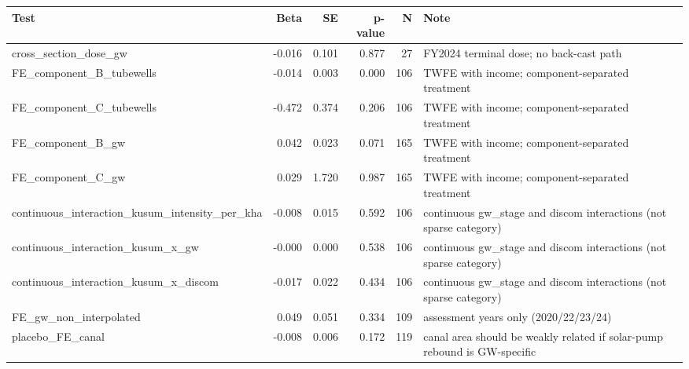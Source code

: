 \begin{tabular}{lrrrrl}
\toprule
Test & Beta & SE & p-value & N & Note \\
\midrule
cross_section_dose_gw & -0.016 & 0.101 & 0.877 & 27 & FY2024 terminal dose; no back-cast path \\
FE_component_B_tubewells & -0.014 & 0.003 & 0.000 & 106 & TWFE with income; component-separated treatment \\
FE_component_C_tubewells & -0.472 & 0.374 & 0.206 & 106 & TWFE with income; component-separated treatment \\
FE_component_B_gw & 0.042 & 0.023 & 0.071 & 165 & TWFE with income; component-separated treatment \\
FE_component_C_gw & 0.029 & 1.720 & 0.987 & 165 & TWFE with income; component-separated treatment \\
continuous_interaction_kusum_intensity_per_kha & -0.008 & 0.015 & 0.592 & 106 & continuous gw_stage and discom interactions (not sparse category) \\
continuous_interaction_kusum_x_gw & -0.000 & 0.000 & 0.538 & 106 & continuous gw_stage and discom interactions (not sparse category) \\
continuous_interaction_kusum_x_discom & -0.017 & 0.022 & 0.434 & 106 & continuous gw_stage and discom interactions (not sparse category) \\
FE_gw_non_interpolated & 0.049 & 0.051 & 0.334 & 109 & assessment years only (2020/22/23/24) \\
placebo_FE_canal & -0.008 & 0.006 & 0.172 & 119 & canal area should be weakly related if solar-pump rebound is GW-specific \\
\bottomrule
\end{tabular}
